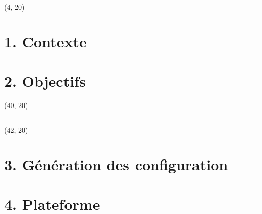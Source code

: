 \documentclass{beamer}
\begin{document}
\setlength{\TPHorizModule}{1cm}
\setlength{\TPVertModule}{1cm}


\makeposter

\begin{textblock}{36}(4, 20)
	\begin{minipage}{0.99\textwidth}
	\section{1. Contexte}
	\lipsum[1]
		
		
	\section{2. Objectifs}
	\lipsum[2-4]
	\end{minipage}
\end{textblock}
\begin{textblock}{2}(40, 20)
	\begin{minipage}{0.99\textwidth}
	\begin{center}
	\rule{5pt}{84cm}	
	\end{center}
	\end{minipage}
\end{textblock}
\begin{textblock}{36}(42, 20)
	\begin{minipage}{0.99\textwidth}
	
	\section{3. Génération des configuration}
	\lipsum[5-7]
	
	
	\section{4. Plateforme}
	\lipsum[8-9]
	\end{minipage}
\end{textblock}
\end{document}
